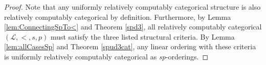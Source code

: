 \documentclass[11pt]{amsart}
\theoremstyle{definition}
\def\L{\mathcal L}
\begin{document}
\begin{proof}
    Note that any uniformly relatively computably categorical structure is also relatively computably categorical by definition.
    Furthermore, by Lemma \ref{lem:ConnectingSpTo<} and Theorem \ref{spd3}, all relatively computably categorical $(\L,<,s,p)$ must satisfy the three listed structural criteria.
    By Lemma \ref{lem:allCasesSp} and Theorem \ref{spud3cat}, any linear ordering with these criteria is uniformly relatively computably categorical as \textit{sp}-orderings.
\end{proof}




\end{document}
